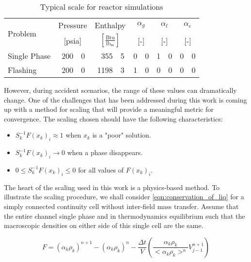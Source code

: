 \begin{table}[ht]
\centering
\begin{tabular}{@{}lr@{.}lr@{.}lr@{.}lr@{.}lr@{.}l@{}} \toprule
\multirow{2}{*}{Problem} & \multicolumn{2}{c}{Pressure} & \multicolumn{2}{c}{Enthalpy}             & \multicolumn{2}{c}{$\alpha_g$} & \multicolumn{2}{c}{$\alpha_l$} & \multicolumn{2}{c}{$\alpha_e$} \\ 
                         & \multicolumn{2}{c}{[psia]} & \multicolumn{2}{c}{$[\frac{\text{Btu}}{\text{lb}_{\text{m}}}]$} & \multicolumn{2}{c}{[-]}      & \multicolumn{2}{c}{[-]}      & \multicolumn{2}{c}{[-]}      \\ \midrule
Single Phase             &  200&0                       &  355&5                                   & 0&0                            & 1&0                            & 0&0 \\
Flashing                 &  200&0                       & 1198&3                                   & 1&0                            & 0&0                            & 0&0 \\ \bottomrule  
\end{tabular}
\caption{Typical scale for reactor simulations}
\label{tab:scaling_units_scales}
\end{table}

However, during accident scenarios, the range of these values can dramatically change.
One of the challenges that has been addressed during this work is coming up with a method for scaling that will provide a meaningful metric for convergence.
The scaling chosen should have the following characteristics:
\begin{itemize}
\item{$S^{-1}_k F(x_k)_i \approx 1$ when $x_k$ is a "poor" solution.}
\item{$S^{-1}_k F(x_k)_i \rightarrow 0$ when a phase disappears.}
\item{$0 \leq S^{-1}_k F(x_k)_i \leq 0 $ for all values of $F(x_k)_i$.}
\end{itemize}

The heart of the scaling used in this work is a physics-based method.
To illustrate the scaling procedure, we shall consider \eqref{eqn:conservation_of_liq} for a simply connected continuity cell without inter-field mass transfer.
Assume that the entire channel single phase and in thermodynamics equilibrium such that the macroscopic densities on either side of this single cell are the same.

\begin{equation}
F = \left(\alpha_k \rho_k\right)^{n+1} - \left( \alpha_k \rho_k \right)^n - \frac{\Delta t}{V} \left( \frac{\alpha_k \rho_k }{<\alpha_k \rho_k>^n} V^{n+1}_{j-1} \right)
\end{equation}

